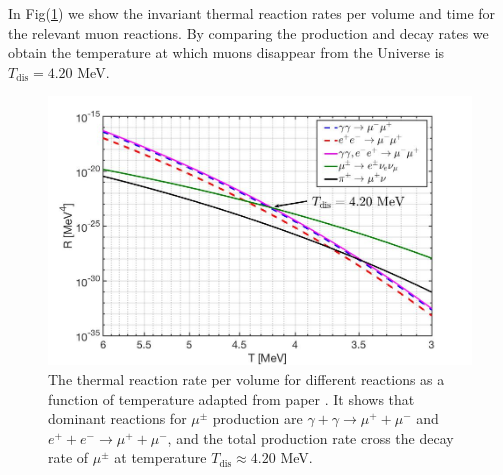 \documentclass[universe,article,submit,moreauthors,pdftex,a4paper]{Definitions/mdpi}
\begin{document}
In Fig(\ref{muon_fig}) we show the invariant thermal reaction rates per volume and time for the relevant muon reactions. By comparing the production and decay rates we obtain the temperature at which muons disappear from the Universe is $T_\mathrm{dis} = 4.20$ MeV. 
\begin{figure}[t]
\centering
\includegraphics[width=0.9\columnwidth]{./plots/MuonRate_new2.jpg}
\caption{The thermal reaction rate per volume for different reactions as a function of temperature adapted from paper \cite{Rafelski:2021aey}. It shows that dominant reactions for $\mu^\pm$ production are ${\gamma+\gamma\to\mu^++\mu^-}$ and $e^++e^-\to\mu^++\mu^-$, and the total production rate cross the decay rate of $\mu^\pm$ at temperature $T_\mathrm{dis}\approx 4.20$ MeV.}
\label{muon_fig} 
\end{figure}
\end{document}
